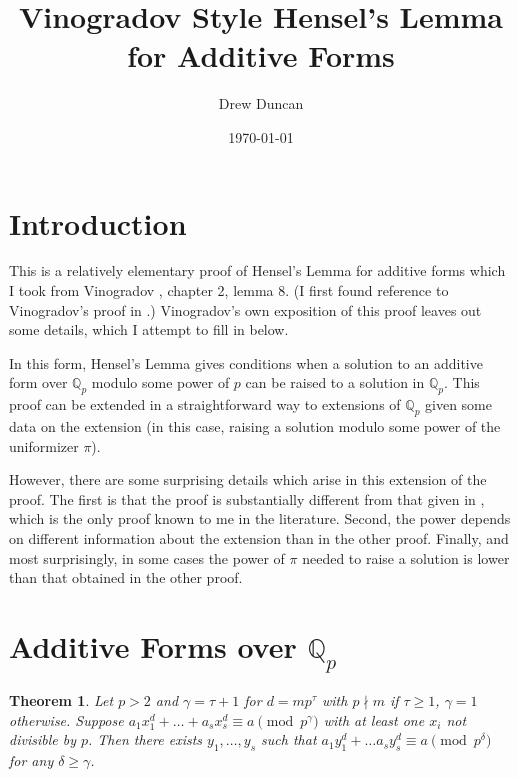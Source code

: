 \documentclass{article}
\title{Vinogradov Style Hensel's Lemma for Additive Forms}
\author{Drew Duncan}
\date{\today}
\newtheorem{theorem}{Theorem}
\begin{document}
\maketitle

\section{Introduction}
This is a relatively elementary proof of Hensel's Lemma for additive forms which I took from Vinogradov \cite{vinogradov2016elements}, chapter 2, lemma 8.  (I first found reference to Vinogradov's proof in \cite{davenport1963homogeneous}.)  Vinogradov's own exposition of this proof leaves out some details, which I attempt to fill in below.

In this form, Hensel's Lemma gives conditions when a solution to an additive form over $\mathbb{Q}_p$ modulo some power of $p$ can be raised to a solution in $\mathbb{Q}_p$.  This proof can be extended in a straightforward way to extensions of $\mathbb{Q}_p$ given some data on the extension (in this case, raising a solution modulo some power of the uniformizer $\pi$). 

However, there are some surprising details which arise in this extension of the proof.  The first is that the proof is substantially different from that given in \cite{leep2018diagonal}, which is the only proof known to me in the literature.  Second, the power depends on different information about the extension than in the other proof.  Finally, and most surprisingly, in some cases the power of $\pi$ needed to raise a solution is lower than that obtained in the other proof.

\section{Additive Forms over $\mathbb{Q}_p$}

\begin{theorem}
Let $p>2$ and  $\gamma = \tau+1$ for $d=m p^\tau$ with $p \nmid m$ if $\tau \ge 1$, $\gamma = 1$ otherwise.  Suppose $a_1 x_1^d + \ldots + a_s x_s^d \equiv a \pmod{p^\gamma}$ with at least one $x_i$ not divisible by $p$.  Then there exists $y_1, \ldots, y_s$ such that $a_1 y_1^d + \ldots a_s y_s^d \equiv a \pmod{p^\delta}$ for any $\delta \ge \gamma$.
\end{theorem}
\end{document}
